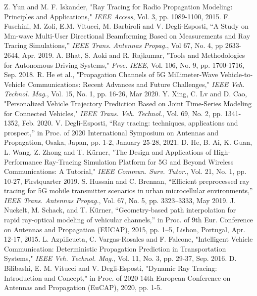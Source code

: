 \begin{thebibliography}{}



    Z. Yun and M. F. Iskander, "Ray Tracing for Radio Propagation Modeling: Principles and Applications," \textit{IEEE Access}, Vol. 3, pp. 1089-1100, 2015.
    F. Fuschini, M. Zoli, E.M. Vitucci, M. Barbiroli and V. Degli-Esposti, “A Study on Mm-wave Multi-User Directional Beamforming Based on Measurements and Ray Tracing Simulations,” \textit{IEEE Trans. Antennas Propag.}, Vol 67, No. 4, pp 2633-2644, Apr. 2019.
    A. Bhat, S. Aoki and R. Rajkumar, "Tools and Methodologies for Autonomous Driving Systems," \textit{Proc. IEEE}, Vol. 106, No. 9, pp. 1700-1716, Sep. 2018.
    R. He et al., "Propagation Channels of 5G Millimeter-Wave Vehicle-to-Vehicle Communications: Recent Advances and Future Challenges," \textit{IEEE Veh. Technol. Mag.}, Vol. 15, No. 1, pp. 16-26, Mar 2020.
    Y. Xing, C. Lv and D. Cao, "Personalized Vehicle Trajectory Prediction Based on Joint Time-Series Modeling for Connected Vehicles," \textit{IEEE Trans. Veh. Technol.}, Vol. 69, No. 2, pp. 1341-1352, Feb. 2020.
    V. Degli-Esposti, “Ray tracing: techniques, applications and prospect,” in Proc. of 2020 International Symposium on Antennas and Propagation, Osaka, Japan, pp. 1-2, January 25-28, 2021.
    D. He, B. Ai, K. Guan, L. Wang, Z. Zhong and T. Kürner, "The Design and Applications of High-Performance Ray-Tracing Simulation Platform for 5G and Beyond Wireless Communications: A Tutorial," \textit{IEEE Commun. Surv. Tutor.}, Vol. 21, No. 1, pp. 10-27, Firstquarter 2019.
    S. Hussain and C. Brennan, “Efficient preprocessed ray tracing for 5G mobile transmitter scenarios in urban microcellular environments,” \textit{IEEE Trans. Antennas Propag.}, Vol. 67, No. 5, pp. 3323–3333, May 2019.
    J. Nuckelt, M. Schack, and T. Kürner, “Geometry-based path interpolation for rapid ray-optical modeling of vehicular channels,” in Proc. of 9th Eur. Conference on Antennas and Propagation (EUCAP), 2015, pp. 1–5, Lisbon, Portugal, Apr. 12-17, 2015.
    L. Azpilicueta, C. Vargas-Rosales and F. Falcone, "Intelligent Vehicle Communication: Deterministic Propagation Prediction in Transportation Systems," \textit{IEEE Veh. Technol. Mag.}, Vol. 11, No. 3, pp. 29-37, Sep. 2016.
    D. Bilibashi, E. M. Vitucci and V. Degli-Esposti, "Dynamic Ray Tracing: Introduction and Concept," in Proc. of 2020 14th European Conference on Antennas and Propagation (EuCAP), 2020, pp. 1-5.

\end{thebibliography}
